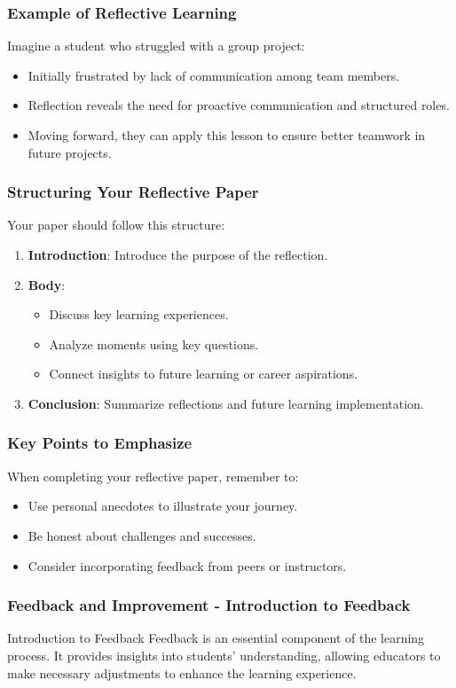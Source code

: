 \documentclass[aspectratio=169]{beamer}
\begin{document}
\begin{frame}[fragile]
    \frametitle{Example of Reflective Learning}
    Imagine a student who struggled with a group project:
    \begin{itemize}
        \item Initially frustrated by lack of communication among team members.
        \item Reflection reveals the need for proactive communication and structured roles.
        \item Moving forward, they can apply this lesson to ensure better teamwork in future projects.
    \end{itemize}
\end{frame}

\begin{frame}[fragile]
    \frametitle{Structuring Your Reflective Paper}
    Your paper should follow this structure:
    \begin{enumerate}
        \item \textbf{Introduction}: Introduce the purpose of the reflection.
        \item \textbf{Body}:
        \begin{itemize}
            \item Discuss key learning experiences.
            \item Analyze moments using key questions.
            \item Connect insights to future learning or career aspirations.
        \end{itemize}
        \item \textbf{Conclusion}: Summarize reflections and future learning implementation.
    \end{enumerate}
\end{frame}

\begin{frame}[fragile]
    \frametitle{Key Points to Emphasize}
    When completing your reflective paper, remember to:
    \begin{itemize}
        \item Use personal anecdotes to illustrate your journey.
        \item Be honest about challenges and successes.
        \item Consider incorporating feedback from peers or instructors.
    \end{itemize}
\end{frame}

\begin{frame}[fragile]
    \frametitle{Feedback and Improvement - Introduction to Feedback}
    \begin{block}{Introduction to Feedback}
        Feedback is an essential component of the learning process. It provides insights into students' understanding, allowing educators to make necessary adjustments to enhance the learning experience.
    \end{block}
\end{frame}
\end{document}
